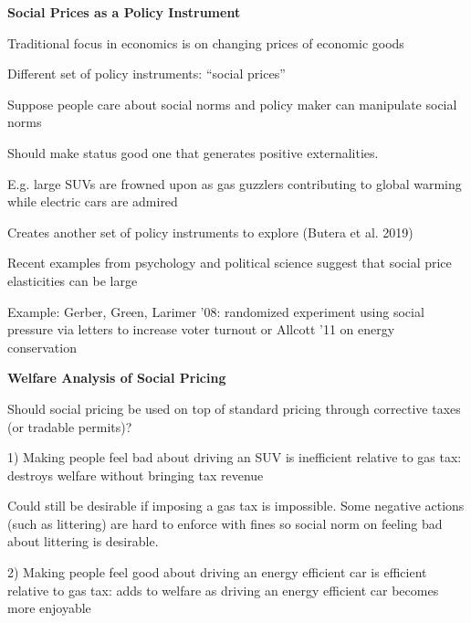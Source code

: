 \documentclass[landscape]{slides}
\begin{document}
\begin{slide}
\begin{center}
{\bf Social Prices as a Policy Instrument}
\end{center}

Traditional focus in economics is on changing prices of economic goods

Different set of policy instruments: ``social prices''

Suppose people care about social norms and policy maker can manipulate social norms


\small
Should make status good one that generates positive externalities.

E.g. large SUVs are frowned upon as gas guzzlers contributing to global warming
while electric cars are admired

Creates another set of policy instruments to explore (Butera et al. 2019) 
\normalsize

Recent examples from psychology and political science suggest that social price elasticities can be large

Example: Gerber, Green, Larimer '08: randomized experiment using social pressure via letters to increase voter turnout or Allcott '11 on energy conservation

\end{slide}

\begin{slide}

\end{slide}


\begin{slide}
\begin{center}
{\bf Welfare Analysis of Social Pricing}
\end{center}
Should social pricing be used on top of standard pricing through corrective taxes (or tradable permits)? 

1) Making people feel bad about driving an SUV is inefficient relative to gas tax: destroys welfare without bringing tax revenue

Could still be desirable if imposing a gas tax is impossible. Some negative actions (such as littering) are hard to enforce with 
fines so social norm on feeling bad about littering is desirable.

2) Making people feel good about driving an energy efficient car is efficient relative to gas tax: adds to welfare as driving an energy efficient car becomes more enjoyable

\end{slide}
\end{document}
